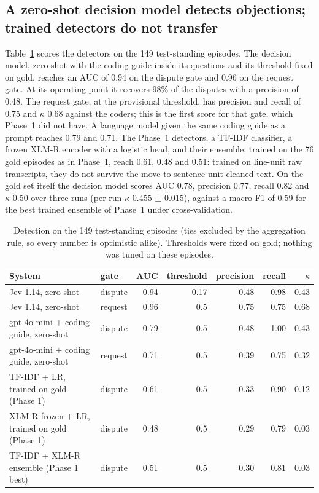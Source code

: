 \documentclass[preprint,12pt,3p,times]{elsarticle}
\begin{document}
\subsection{A zero-shot decision model detects objections; trained detectors do not transfer}
\label{sec:res-detect}

Table~\ref{tab:detect} scores the detectors on the 149 test-standing episodes. The decision model, zero-shot with the coding guide inside its questions and its threshold fixed on gold, reaches an AUC of 0.94 on the dispute gate and 0.96 on the request gate. At its operating point it recovers 98\% of the disputes with a precision of 0.48. The request gate, at the provisional threshold, has precision and recall of 0.75 and $\kappa$ 0.68 against the coders; this is the first score for that gate, which Phase~1 did not have. A language model given the same coding guide as a prompt reaches 0.79 and 0.71. The Phase~1 detectors, a TF-IDF classifier, a frozen XLM-R encoder with a logistic head, and their ensemble, trained on the 76 gold episodes as in Phase~1, reach 0.61, 0.48 and 0.51: trained on line-unit raw transcripts, they do not survive the move to sentence-unit cleaned text. On the gold set itself the decision model scores AUC 0.78, precision 0.77, recall 0.82 and $\kappa$ 0.50 over three runs (per-run $\kappa$ 0.455 $\pm$ 0.015), against a macro-F1 of 0.59 for the best trained ensemble of Phase~1 under cross-validation.

\begin{table}[t]
\centering
\caption{Detection on the 149 test-standing episodes (ties excluded by the aggregation rule, so every number is optimistic alike). Thresholds were fixed on gold; nothing was tuned on these episodes.}
\label{tab:detect}
\small
\begin{tabular}{llrrrrr}
\toprule
System & gate & AUC & threshold & precision & recall & $\kappa$ \\
\midrule
Jev 1.14, zero-shot & dispute & 0.94 & 0.17 & 0.48 & 0.98 & 0.43 \\
Jev 1.14, zero-shot & request & 0.96 & 0.5 & 0.75 & 0.75 & 0.68 \\
gpt-4o-mini + coding guide, zero-shot & dispute & 0.79 & 0.5 & 0.48 & 1.00 & 0.43 \\
gpt-4o-mini + coding guide, zero-shot & request & 0.71 & 0.5 & 0.39 & 0.75 & 0.32 \\
TF-IDF + LR, trained on gold (Phase 1) & dispute & 0.61 & 0.5 & 0.33 & 0.90 & 0.12 \\
XLM-R frozen + LR, trained on gold (Phase 1) & dispute & 0.48 & 0.5 & 0.29 & 0.79 & 0.03 \\
TF-IDF + XLM-R ensemble (Phase 1 best) & dispute & 0.51 & 0.5 & 0.30 & 0.81 & 0.03 \\
\bottomrule
\end{tabular}
\end{table}
\end{document}
